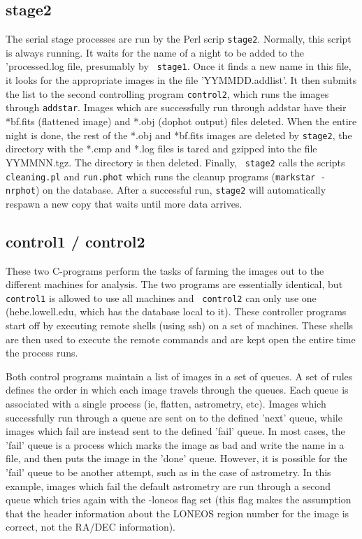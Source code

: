 \documentclass{article}
\begin{document}
\subsection{stage2}
The serial stage processes are run by the Perl scrip {\tt stage2}.
Normally, this script is always running.  It waits for the name of a
night to be added to the 'processed.log file, presumably by {\tt
stage1}.  Once it finds a new name in this file, it looks for the
appropriate images in the file 'YYMMDD.addlist'.  It then submits the
list to the second controlling program {\tt control2}, which runs the
images through {\tt addstar}.  Images which are successfully run
through addstar have their *bf.fits (flattened image) and *.obj
(dophot output) files deleted.  When the entire night is done, the
rest of the *.obj and *bf.fits images are deleted by {\tt stage2}, the
directory with the *.cmp and *.log files is tared and gzipped into the
file YYMMNN.tgz.  The directory is then deleted.  Finally, {\tt
stage2} calls the scripts {\tt cleaning.pl} and {\tt run.phot} which
runs the cleanup programs ({\tt markstar - nrphot}) on the database.
After a successful run, {\tt stage2} will automatically respawn a new
copy that waits until more data arrives.

\subsection{control1 / control2}
These two C-programs perform the tasks of farming the images out to
the different machines for analysis.  The two programs are essentially
identical, but {\tt control1} is allowed to use all machines and {\tt
control2} can only use one (hebe.lowell.edu, which has the database
local to it).  These controller programs start off by executing remote
shells (using ssh) on a set of machines.  These shells are then used
to execute the remote commands and are kept open the entire time the
process runs.  

Both control programs maintain a list of images in a set of queues.  A
set of rules defines the order in which each image travels through the
queues.  Each queue is associated with a single process (ie, flatten,
astrometry, etc).  Images which successfully run through a queue are
sent on to the defined 'next' queue, while images which fail are
instead sent to the defined 'fail' queue.  In most cases, the 'fail'
queue is a process which marks the image as bad and write the name in
a file, and then puts the image in the 'done' queue.  However, it is
possible for the 'fail' queue to be another attempt, such as in the
case of astrometry.  In this example, images which fail the default
astrometry are run through a second queue which tries again with the
-loneos flag set (this flag makes the assumption that the header
information about the LONEOS region number for the image is correct,
not the RA/DEC information).
\end{document}
